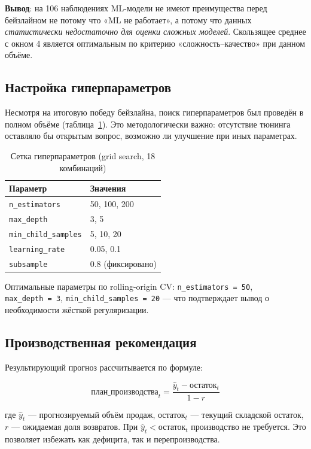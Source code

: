\textbf{Вывод}: на 106 наблюдениях ML-модели не имеют преимущества перед бейзлайном не потому что «ML не работает», а потому что данных \textit{статистически недостаточно для оценки сложных моделей}. Скользящее среднее с окном 4 является оптимальным по критерию «сложность--качество» при данном объёме.

\subsection{Настройка гиперпараметров}

Несмотря на итоговую победу бейзлайна, поиск гиперпараметров был проведён в полном объёме (таблица~\ref{tab:hyperparam_grid}). Это методологически важно: отсутствие тюнинга оставляло бы открытым вопрос, возможно ли улучшение при иных параметрах.

\begin{table}[H]
\centering
\caption{Сетка гиперпараметров (grid search, 18 комбинаций)}
\label{tab:hyperparam_grid}
\begin{tabular}{ll}
\toprule
\textbf{Параметр} & \textbf{Значения} \\
\midrule
\texttt{n\_estimators} & 50, 100, 200 \\
\texttt{max\_depth} & 3, 5 \\
\texttt{min\_child\_samples} & 5, 10, 20 \\
\texttt{learning\_rate} & 0.05, 0.1 \\
\texttt{subsample} & 0.8 (фиксировано) \\
\bottomrule
\end{tabular}
\end{table}

Оптимальные параметры по rolling-origin CV: \texttt{n\_estimators~=~50}, \texttt{max\_depth~=~3}, \texttt{min\_child\_samples~=~20} --- что подтверждает вывод о необходимости жёсткой регуляризации.

\subsection{Производственная рекомендация}

Результирующий прогноз рассчитывается по формуле:

\begin{equation}
\text{план\_производства}_t = \frac{\hat{y}_t - \text{остаток}_t}{1 - r}
\end{equation}

где $\hat{y}_t$ --- прогнозируемый объём продаж, $\text{остаток}_t$ --- текущий складской остаток, $r$ --- ожидаемая доля возвратов. При $\hat{y}_t < \text{остаток}_t$ производство не требуется. Это позволяет избежать как дефицита, так и перепроизводства.

